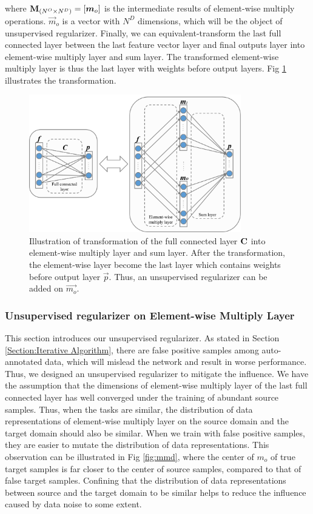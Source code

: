 \documentclass[runningheads]{llncs}
\begin{document}
where ${\bf M}_{(N^{O}\times N^{D})} = [\vec{m}_{o}]$ is the intermediate results of element-wise multiply operations. $\vec{m}_{o}$ is a vector with $N^{D}$ dimensions, which will be the object of unsupervised regularizer. Finally, we can equivalent-transform the last full connected layer between the last feature vector layer and final outputs layer into element-wise multiply layer and sum layer. The transformed element-wise multiply layer is thus the last layer with weights before output layers. Fig \ref{fig:elementwiselayer} illustrates the transformation.

\begin{figure}
\centering
\includegraphics[height=6cm]{images/elementwiselayer.png}
\caption{Illustration of transformation of the full connected layer ${\bf C}$ into element-wise multiply layer and sum layer. After the transformation, the element-wise layer become the last layer which contains weights before output layer $\vec{p}$. Thus, an unsupervised regularizer can be added on $\vec{m_{o}}$.}
\label{fig:elementwiselayer}
\end{figure}

\subsubsection{Unsupervised regularizer on Element-wise Multiply Layer}

This section introduces our unsupervised regularizer. As stated in Section \ref{Section:Iterative Algorithm}, there are false positive samples among auto-annotated data, which will mislead the network and result in worse performance. Thus, we designed an unsupervised regularizer to mitigate the influence. We have the assumption that the dimensions of element-wise multiply layer of the last full connected layer has well converged under the training of abundant source samples. Thus, when the tasks are similar, the distribution of data representations of element-wise multiply layer on the source domain and the target domain should also be similar. When we train with false positive samples, they are easier to mutate the distribution of data representations. This observation can be illustrated in Fig \ref{fig:mmd}, where the center of $m_{o}$ of true target samples is far closer to the center of source samples, compared to that of false target samples. Confining that the distribution of data representations between source and the target domain to be similar helps to reduce the influence caused by data noise to some extent.
\end{document}
